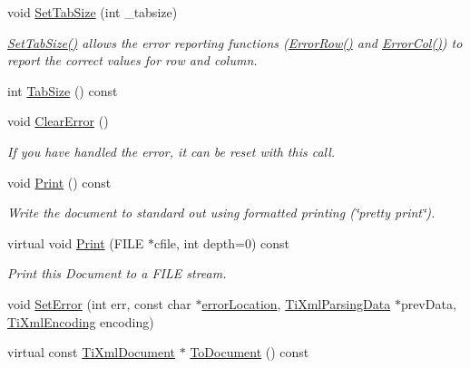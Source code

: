 \begin{DoxyCompactItemize}
void \hyperlink{classTiXmlDocument_a51dac56316f89b35bdb7d0d433ba988e}{SetTabSize} (int \_\-tabsize)
\begin{DoxyCompactList}\small\item\em \hyperlink{classTiXmlDocument_a51dac56316f89b35bdb7d0d433ba988e}{SetTabSize()} allows the error reporting functions (\hyperlink{classTiXmlDocument_af30efc75e804aa2e92fb8be3a8cb676e}{ErrorRow()} and \hyperlink{classTiXmlDocument_aa90bc630ee5203c6109ca5fad3323649}{ErrorCol()}) to report the correct values for row and column. \item\end{DoxyCompactList}\item 
int \hyperlink{classTiXmlDocument_a612360241b85bad0826b2a9ae9cda561}{TabSize} () const 
\item 
void \hyperlink{classTiXmlDocument_ac66b8c28db86363315712a3574e87c35}{ClearError} ()
\begin{DoxyCompactList}\small\item\em If you have handled the error, it can be reset with this call. \item\end{DoxyCompactList}\item 
void \hyperlink{classTiXmlDocument_af08389ec70ee9b2de7f800e206a18510}{Print} () const 
\begin{DoxyCompactList}\small\item\em Write the document to standard out using formatted printing (\char`\"{}pretty print\char`\"{}). \item\end{DoxyCompactList}\item 
virtual void \hyperlink{classTiXmlDocument_a7b1aea204fee266b70b9c105c8bf2ada}{Print} (FILE $\ast$cfile, int depth=0) const 
\begin{DoxyCompactList}\small\item\em Print this Document to a FILE stream. \item\end{DoxyCompactList}\item 
void \hyperlink{classTiXmlDocument_a735c23e318597b920c94eae77fa206de}{SetError} (int err, const char $\ast$\hyperlink{classTiXmlDocument_aa4030f989f1549f6b897147fc2851d1a}{errorLocation}, \hyperlink{classTiXmlParsingData}{TiXmlParsingData} $\ast$prevData, \hyperlink{tinyxml_8h_a88d51847a13ee0f4b4d320d03d2c4d96}{TiXmlEncoding} encoding)
\item 
virtual const \hyperlink{classTiXmlDocument}{TiXmlDocument} $\ast$ \hyperlink{classTiXmlDocument_a1dc977bde3e4fe85a8eb9d88a35ef5a4}{ToDocument} () const 

\end{DoxyCompactItemize}
